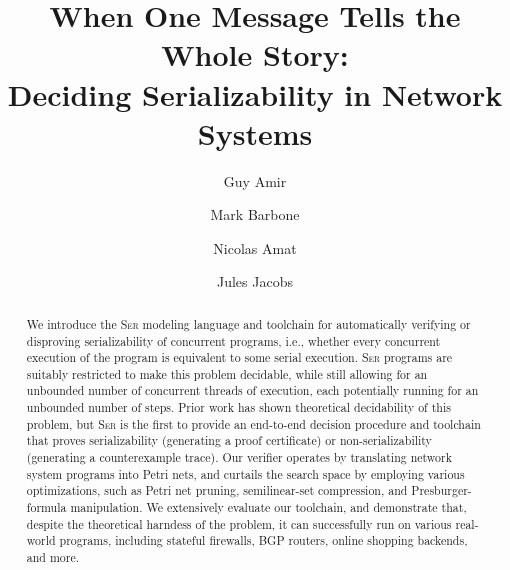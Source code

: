 \documentclass[a4paper]{llncs}
\title{When One Message Tells the Whole Story:\\ Deciding Serializability in Network Systems}
\author{
			Guy Amir \and
			Mark Barbone \and
			Nicolas Amat \and
			Jules Jacobs
		}
\institute{}
\newcommand{\toolname}{\textsc{Ser}}
\let\oldmaketitle\maketitle
\renewcommand{\maketitle}{
  \oldmaketitle
  \pagestyle{plain}  %
  \thispagestyle{plain}  %
}
\begin{document}
%	

\maketitle

\begin{abstract}
	We introduce the \toolname{} modeling language and toolchain for automatically verifying or disproving serializability of concurrent programs, i.e., whether every concurrent execution of the program is equivalent to some serial execution.
	\toolname{} programs are suitably restricted to make this problem decidable, while still allowing for an unbounded number of concurrent threads of execution, each potentially running for an unbounded number of steps.
	Prior work has shown theoretical decidability of this problem, but \toolname{} is the first to provide an end-to-end decision procedure and toolchain that proves serializability (generating a proof certificate) or non-serializability (generating a counterexample trace).
	Our verifier operates by translating network system programs into Petri nets, and curtails the search space by employing various optimizations, such as Petri net pruning, semilinear-set compression, and Presburger-formula manipulation.
	We extensively evaluate our toolchain, and demonstrate that, despite the theoretical harndess of the problem, it can successfully run on various real-world programs, including stateful firewalls, BGP routers, online shopping backends, and more.
\end{abstract}



%








\newpage

{
	
	
}

\newpage











\end{document}

